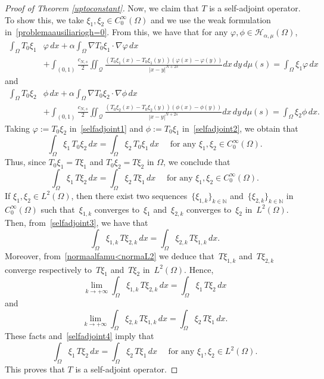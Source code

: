 \documentclass[12pt,a4paper,intlimits,sumlimits]{amsart}
\def \N {\mathbb{N}}
\def \Q {\mathcal Q}
\theoremstyle{definition}
\theoremstyle{plain}
\numberwithin{equation}{section}
\begin{document}
\begin{appendix}
\begin{proof}[Proof of Theorem \ref{uptoconstant}]
Now, we claim that $T$ is a self-adjoint operator. To show this,
we take $\xi_1,\xi_2\in C^\infty_0(\Omega)$ and we use the weak
formulation in~\eqref{problemaausiliariogh=0}. {F}rom this, we have that for any $\varphi, \phi\in \mathcal{H}_{\alpha,\mu}(\Omega)$,
\begin{equation}\label{selfadjoint1}
\begin{aligned}
\int_\Omega T_0\xi_1&\varphi\,dx+\alpha \int_\Omega \nabla T_0\xi_1\cdot\nabla \varphi\, dx \\ 
&+\int_{(0, 1)} \frac{c_{N, s}}{2} \iint_{\Q} \frac{(T_0\xi_1(x)-T_0\xi_1(y))(\varphi(x)-\varphi(y))}{|x-y|^{N+2s}} dx\,dy\, d\mu(s) 
=\int_\Omega \xi_1\varphi\,dx
\end{aligned}
\end{equation}
and
\begin{equation}\label{selfadjoint2}
\begin{aligned}
\int_\Omega T_0\xi_2&\phi\,dx+\alpha \int_\Omega \nabla T_0\xi_2\cdot\nabla \phi\, dx \\ 
&+\int_{(0, 1)} \frac{c_{N, s}}{2} \iint_{\Q} \frac{(T_0\xi_2(x)-T_0\xi_2(y))(\phi(x)-\phi(y))}{|x-y|^{N+2s}} dx\,dy\, d\mu(s) 
=\int_\Omega \xi_2\phi\,dx.
\end{aligned}
\end{equation}
Taking $\varphi:=T_0\xi_2$ in~\eqref{selfadjoint1} and
$\phi:=T_0\xi_1$ in~\eqref{selfadjoint2}, we obtain that
\[
\int_\Omega \xi_1\, T_0\xi_2\,dx=\int_\Omega \xi_2\, T_0\xi_1\,dx\quad\mbox{ for any } \xi_1,\xi_2\in C^\infty_0(\Omega).
\]
Thus, since
$T_0\xi_1=T\xi_1$ and $T_0\xi_2=T\xi_2$ in $\Omega$, we 
conclude that 
\begin{equation}\label{selfadjoint3}
\int_\Omega \xi_1\, T\xi_2\,dx=\int_\Omega \xi_2\, T\xi_1\,dx\quad\mbox{ for any } \xi_1,\xi_2\in C^\infty_0(\Omega).
\end{equation}
If $\xi_1,\xi_2\in L^2(\Omega)$, then there exist two sequences~$\{\xi_{1,k}\}_{k\in \N}$ and~$\{\xi_{2,k}\}_{k\in \N}$ in~$C^\infty_0(\Omega)$ such that~$\xi_{1,k}$ converges to~$\xi_1$
and~$\xi_{2,k}$ converges to~$\xi_2$ in~$L^2(\Omega)$.
Then, from~\eqref{selfadjoint3}, we have that
\begin{equation}\label{selfadjoint4}
\int_\Omega \xi_{1,k}\, T\xi_{2,k}\,dx
=\int_\Omega \xi_{2,k}\, T\xi_{1,k}\,dx.
\end{equation}
Moreover, from~\eqref{normaalfamu<normaL2} we deduce that~$T\xi_{1,k}$ and~$T\xi_{2,k}$ converge respectively to~$T\xi_1$ and~$T\xi_2$ in~$L^2(\Omega)$. Hence,
\[
\lim_{k\to +\infty}\int_\Omega \xi_{1,k}\, T\xi_{2,k}\,dx
=\int_\Omega \xi_{1}\, T\xi_{2}\,dx
\]
and
\[
\lim_{k\to +\infty}\int_\Omega \xi_{2,k}\, T\xi_{1,k}\,dx
=\int_\Omega \xi_{2}\, T\xi_{1}\,dx.
\]
These facts and~\eqref{selfadjoint4} imply that 
\[
\int_\Omega \xi_{1}\, T\xi_{2}\,dx=\int_\Omega \xi_{2}\, T\xi_{1}\,dx \quad\mbox{ for any } \xi_1,\xi_2\in L^2 (\Omega).
\]
This proves that $T$ is a self-adjoint operator.


\end{proof}
\end{appendix}
\end{document}
